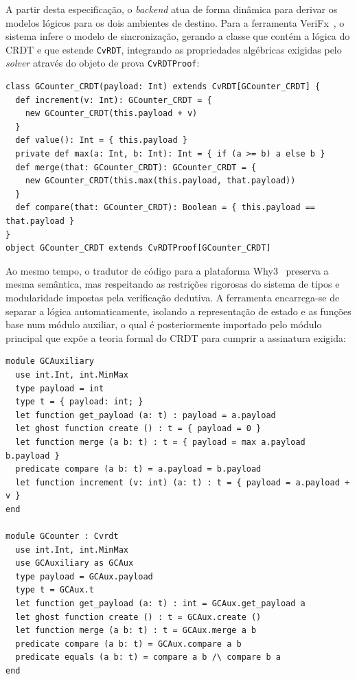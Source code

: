 \documentclass{llncs}
\begin{document}
A partir desta especificação, o \textit{backend} atua de forma dinâmica para derivar os modelos lógicos para os dois ambientes de destino.
Para a ferramenta VeriFx~\cite{porre2023masses}, o sistema infere o modelo de sincronização, gerando a classe que contém a lógica do CRDT e que estende \texttt{CvRDT},
integrando as propriedades algébricas exigidas pelo \textit{solver} através do objeto de prova \texttt{CvRDTProof}:

\begin{verbatim}
class GCounter_CRDT(payload: Int) extends CvRDT[GCounter_CRDT] {
  def increment(v: Int): GCounter_CRDT = {
    new GCounter_CRDT(this.payload + v)
  }
  def value(): Int = { this.payload }
  private def max(a: Int, b: Int): Int = { if (a >= b) a else b }
  def merge(that: GCounter_CRDT): GCounter_CRDT = {
    new GCounter_CRDT(this.max(this.payload, that.payload))
  }
  def compare(that: GCounter_CRDT): Boolean = { this.payload == that.payload }
}
object GCounter_CRDT extends CvRDTProof[GCounter_CRDT]
\end{verbatim}

Ao mesmo tempo, o tradutor de código para a plataforma Why3~\cite{why3} preserva a mesma semântica,
mas respeitando as restrições rigorosas do sistema de tipos e modularidade impostas pela verificação dedutiva.
A ferramenta encarrega-se de separar a lógica automaticamente, isolando a representação de estado e as funções base num módulo auxiliar,
o qual é posteriormente importado pelo módulo principal que expõe a teoria formal do CRDT para cumprir a assinatura exigida:

\begin{verbatim}
module GCAuxiliary
  use int.Int, int.MinMax
  type payload = int
  type t = { payload: int; }
  let function get_payload (a: t) : payload = a.payload
  let ghost function create () : t = { payload = 0 }
  let function merge (a b: t) : t = { payload = max a.payload b.payload }
  predicate compare (a b: t) = a.payload = b.payload
  let function increment (v: int) (a: t) : t = { payload = a.payload + v }
end

module GCounter : Cvrdt
  use int.Int, int.MinMax
  use GCAuxiliary as GCAux
  type payload = GCAux.payload
  type t = GCAux.t
  let function get_payload (a: t) : int = GCAux.get_payload a
  let ghost function create () : t = GCAux.create ()
  let function merge (a b: t) : t = GCAux.merge a b
  predicate compare (a b: t) = GCAux.compare a b
  predicate equals (a b: t) = compare a b /\ compare b a
end
\end{verbatim}
\end{document}
